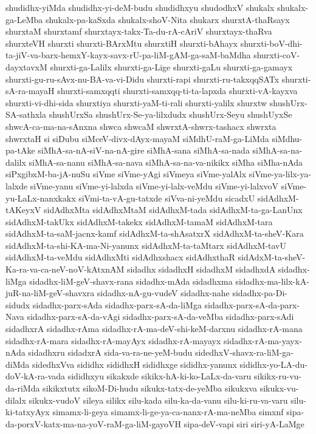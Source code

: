 {shudidhx-yiMda
shudidhx-yi-deM-budu
shudidhxyu
shudodhxV
shukalx
shukalx-ga-LeMba
shukalx-pa-kaSxda
shukalx-shoV-Nita
shukarx
shurxtA-thaRsayx
shurxtaM
shurxtamf
shurxtayx-takx-Ta-du-rA-cAriV
shurxtayx-thaRva
shurxteVH
shurxti
shurxti-BArxMtu
shurxtiH
shurxti-bAhayx
shurxti-boV-dhi-ta-jiV-va-barx-hemxY-kayx-savx-rU-pa-liM-gAM-ga-saM-baMdha
shurxti-coV-dayxtavxM
shurxti-ga-Lalilx
shurxti-ga-Lige
shurxti-gaLu
shurxti-ga-gamayx
shurxti-gu-ru-sAvx-nu-BA-va-vi-Didu
shurxti-rapi
shurxti-ru-takxqqSATx
shurxti-sA-ra-mayaH
shurxti-samxqqti
shurxti-samxqq-ti-ta-lapxda
shurxti-vA-kayxva
shurxti-vi-dhi-sida
shurxtiya
shurxti-yaM-ti-rali
shurxti-yalilx
shurxtw
shushUrx-SA-sathxla
shushUrxSa
shushUrx-Se-ya-lilxdudx
shushUrx-Seyu
shushUyxSe
shwcA-ca-ma-na-sAnxna
shwca
shwcaM
shwrxtA-shwrx-tashacx
shwrxta
shwrxtaH
si
siDubu
siMceV-divx-dAyx-mayaM
siMdhU-raM-ga-LiMda
siMdhu-pa-tAke
siMhA-sa-nA-siV-na-nA-gire
siMhA-sana
siMhA-sa-nada
siMhA-sa-na-dalilx
siMhA-sa-nanu
siMhA-sa-nava
siMhA-sa-na-va-nikikx
siMha
siMha-nAda
siPxgibxM-ba-jA-nuSu
siVme
siVme-yAgi
siVmeya
siVme-yalAlx
siVme-ya-lilx-ya-lalxde
siVme-yanu
siVme-yi-lalxda
siVme-yi-lalx-veMdu
siVme-yi-lalxvoV
siVme-yu-LaLx-nanxkakx
siVmi-ta-vA-gu-tatxde
siVva-ni-yeMdu
sicadxU
sidAdhxM-tAKeyxV
sidAdhxMta
sidAdhxMtaM
sidAdhxM-tada
sidAdhxM-ta-ga-LanUnx
sidAdhxM-takUkx
sidAdhxM-takekx
sidAdhxM-tamaM
sidAdhxM-tara
sidAdhxM-ta-saM-jacnx-kamf
sidAdhxM-ta-shAsatxrX
sidAdhxM-ta-sheV-Kara
sidAdhxM-ta-shi-KA-ma-Ni-yanunx
sidAdhxM-ta-taMtarx
sidAdhxM-tavU
sidAdhxM-ta-veMdu
sidAdhxMti
sidAdhxshacx
sidAdhxthaR
sidAdxM-ta-sheV-Ka-ra-va-ca-neV-noV-kAtxnAM
sidadhx
sidadhxH
sidadhxM
sidadhxdA
sidadhx-liMga
sidadhx-liM-geV-shavx-rana
sidadhx-mAda
sidadhxma
sidadhx-ma-lilx-kA-juR-na-liM-geV-shavxra
sidadhx-nA-gu-vudeV
sidadhx-nahe
sidadhx-pa-Di-sidudx
sidadhx-parx-sAda
sidadhx-parx-sA-da-liMga
sidadhx-parx-sA-da-parx-Nava
sidadhx-parx-sA-da-vAgi
sidadhx-parx-sA-da-veMba
sidadhx-parx-sAdi
sidadhxrA
sidadhx-rAma
sidadhx-rA-ma-deV-shi-keM-darxnu
sidadhx-rA-mana
sidadhx-rA-mara
sidadhx-rA-mayAyx
sidadhx-rA-mayayx
sidadhx-rA-ma-yayx-nAda
sidadhxru
sidadxrA
sida-va-ra-ne-yeM-budu
sidedhxV-shavx-ra-liM-ga-diMda
sidedhxVva
sididhx
sididhxH
sididhxge
sididhx-yanunx
sididhx-yo-LA-du-doV-kA-ra-vada
sididhxyu
sikakxde
sikikx-hA-ki-ko-LaLx-da-varu
sikikx-ru-vu-da-riMda
sikikxtutx
sikoM-Di-hudu
sikukx-tatx-de-yeMba
sikukxva
sikukx-vu-dilalx
sikukx-vudoV
sileya
silikx
silu-kada
silu-ka-da-vanu
silu-ki-ru-va-varu
silu-ki-tatxyAyx
simamx-li-geya
simamx-li-ge-ya-ca-nanx-rA-ma-neMba
simxnf
sipa-da-porxV-katx-ma-na-yoV-raM-ga-liM-gayoVH
sipa-deV-vapi
siri
siri-yA-LaMge
}
